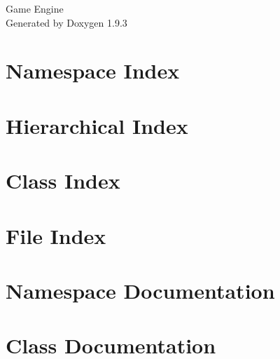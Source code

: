 \documentclass[twoside]{book}
\newcommand{\+}{\discretionary{\mbox{\scriptsize$\hookleftarrow$}}{}{}}
\newcommand{\clearemptydoublepage}{%
    \newpage{\pagestyle{empty}\cleardoublepage}%
  }
\begin{document}
  \raggedbottom
    \hypersetup{pageanchor=false,
                bookmarksnumbered=true,
                pdfencoding=unicode
               }
  \begin{titlepage}
  \vspace*{7cm}
  \begin{center}%
  {\Large Game Engine}\\
  \vspace*{1cm}
  {\large Generated by Doxygen 1.9.3}\\
  \end{center}
  \end{titlepage}
  \clearemptydoublepage
  \tableofcontents
  \clearemptydoublepage
  \hypersetup{pageanchor=true}
\chapter{Namespace Index}

\chapter{Hierarchical Index}

\chapter{Class Index}

\chapter{File Index}

\chapter{Namespace Documentation}

\chapter{Class Documentation}























\end{document}
